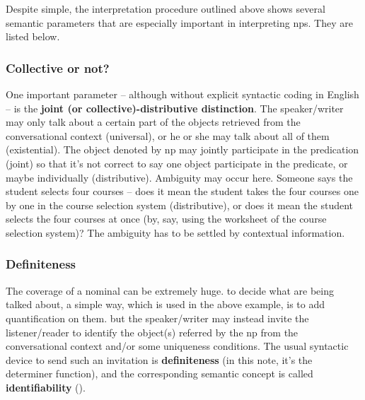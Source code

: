 \documentclass[UTF8, a4paper, oneside, scheme=plain]{ctexrep}
\newcommand*{\concept}[1]{\textbf{#1}}
\begin{document}
Despite simple, the interpretation procedure outlined above 
shows several semantic parameters that are especially important 
in interpreting \acs{np}s.
They are listed below.

\subsubsection{Collective or not?}

One important parameter -- although without explicit syntactic coding in English 
-- is the \concept{joint (or collective)-distributive distinction}.
The speaker/writer may only talk about a certain part of the objects retrieved
from the conversational context (universal), 
or he or she may talk about all of them (existential).
The object denoted by \acs{np} may jointly participate in the predication (joint)
so that it's not correct to say 
one object participate in the predicate,
or maybe individually (distributive).
Ambiguity may occur here.
Someone says the student selects four courses -- 
does it mean the student takes the four courses one by one in the course selection system
(distributive), 
or does it mean the student selects the four courses at once 
(by, say, using the worksheet of the course selection system)?
The ambiguity has to be settled by contextual information.

\subsubsection{Definiteness}

The coverage of a nominal can be extremely huge.
to decide what are being talked about,
a simple way, which is used in the above example, 
is to add quantification on them.
but the speaker/writer may instead invite the listener/reader to 
identify the object(s) referred by the \acs{np} 
from the conversational context
and/or some uniqueness conditions.
The usual syntactic device to send such an invitation 
is \concept{definiteness} 
(in this note, it's the determiner function),
and the corresponding semantic concept is called \concept{identifiability}
().
\end{document}
